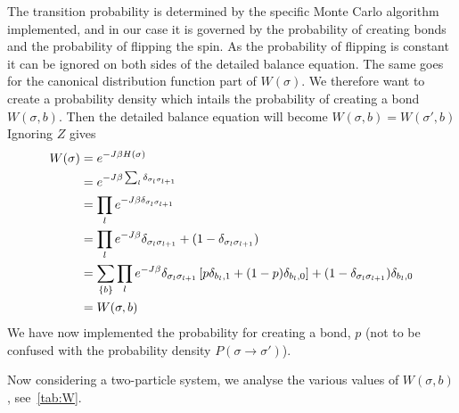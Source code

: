 The transition probability is determined by the specific Monte Carlo algorithm implemented, and in our case it is governed by the probability of creating bonds and the probability of flipping the spin. As the probability of flipping is constant it can be ignored on both sides of the detailed balance equation. The same goes for the canonical distribution function part of $W(\sigma)$. We therefore want to create a probability density which intails the probability of creating a bond $W(\sigma, b)$. Then the detailed balance equation will become $W(\sigma, b) = W(\sigma', b)$
Ignoring $Z$ gives
\begin{align*}
    W(\sigma) &= e^{-J \beta H(\sigma)}\\
    &= e^{-J \beta \sum_l \delta_{\sigma_l \sigma_{l+1}}}\\
    &= \prod_l e^{-J \beta \delta_{\sigma_l \sigma_{l+1}}}\\
    &= \prod_l e^{-J \beta} \delta_{\sigma_l \sigma_{l+1}} + (1-\delta_{\sigma_l \sigma_{l+1}})\\
    &= \sum_{\{b\}} \prod_l e^{-J \beta} \delta_{\sigma_l \sigma_{l+1}} \left[p \delta_{b_l,1} + (1-p)\delta_{b_l,0}\right] + (1-\delta_{\sigma_l \sigma_{l+1}})\delta_{b_l,0}\\
    &= W(\sigma, b)
\end{align*}
We have now implemented the probability for creating a bond, $p$ (not to be confused with the probability density $P(\sigma \rightarrow \sigma')$). 

Now considering a two-particle system, we analyse the various values of $W(\sigma, b)$, see~\cref{tab:W}.

